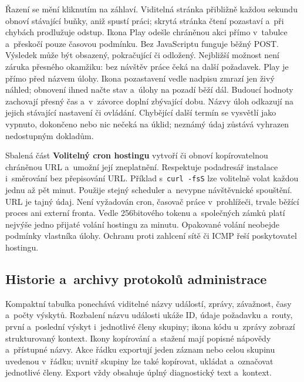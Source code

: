 \documentclass[11pt,a4paper]{article}
\newcommand{\ui}[1]{\textbf{#1}}
\newcommand{\codeword}[1]{\nolinkurl{#1}}
\begin{document}
Řazení se mění kliknutím na záhlaví. Viditelná stránka přibližně každou sekundu
obnoví stávající buňky, aniž spustí práci; skrytá stránka čtení pozastaví
 a~při chybách prodlužuje odstup. Ikona Play odešle chráněnou akci přímo
v~tabulce a~přeskočí pouze časovou podmínku. Bez JavaScriptu funguje běžný POST.
Výsledek může být obsazený, pokračující či odložený. Nejbližší možnost není
záruka přesného okamžiku: bez návštěv práce čeká na další požadavek.
Play je přímo před názvem úlohy. Ikona pozastavení vedle nadpisu zmrazí jen
živý náhled; obnovení ihned načte stav a~úlohy na pozadí běží dál.
Budoucí hodnoty zachovají přesný čas a~v~závorce doplní zbývající dobu.
Názvy úloh odkazují na jejich stávající nastavení či ovládání. Chybějící další
termín se vysvětlí jako vypnuto, dokončeno nebo nic nečeká na úklid;
neznámý údaj zůstává vyhrazen nedostupným dokladům.

Sbalená část \ui{Volitelný cron hostingu} vytvoří či obnoví kopírovatelnou
chráněnou URL a~umožní její zneplatnění. Respektuje podadresář instalace
 i~směrování bez přepisování URL. Příklad s~\codeword{curl -fsS} lze volitelně
volat každou jednu až pět minut. Použije stejný scheduler a~nevypne návštěvnické
spouštění. URL je tajný údaj. Není vyžadován cron, časovač práce v~prohlížeči,
trvale běžící proces ani externí fronta.
Vedle 256bitového tokenu a~společných zámků platí nejvýše jedno přijaté
volání hostingu za minutu. Opakované volání neobejde podmínky vlastníka úlohy.
Ochranu proti zahlcení sítě či ICMP řeší poskytovatel hostingu.

\subsection{Historie a~archivy protokolů administrace}

Kompaktní tabulka ponechává viditelné názvy událostí, zprávy, závažnost, časy
a~počty výskytů. Rozbalení názvu události ukáže ID, údaje požadavku a~routy,
první a~poslední výskyt i~jednotlivé členy skupiny; ikona kódu u~zprávy zobrazí
strukturovaný kontext. Ikony kopírování a~stažení mají popisné nápovědy
a~přístupné názvy. Akce řádku exportují jeden záznam nebo celou skupinu uvedenou
v~řádku; uvnitř skupiny lze také kopírovat, ukládat a~označovat jednotlivé
členy. Export vždy obsahuje úplný diagnostický text a~kontext.
\end{document}
